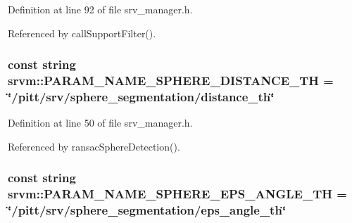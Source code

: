 Definition at line 92 of file srv\-\_\-manager.\-h.



Referenced by call\-Support\-Filter().

\hypertarget{namespacesrvm_aacb054d1f0139845cf32c294b210b96c}{
\subsubsection[{P\-A\-R\-A\-M\-\_\-\-N\-A\-M\-E\-\_\-\-S\-P\-H\-E\-R\-E\-\_\-\-D\-I\-S\-T\-A\-N\-C\-E\-\_\-\-T\-H}]{\setlength{\rightskip}{0pt plus 5cm}const string srvm\-::\-P\-A\-R\-A\-M\-\_\-\-N\-A\-M\-E\-\_\-\-S\-P\-H\-E\-R\-E\-\_\-\-D\-I\-S\-T\-A\-N\-C\-E\-\_\-\-T\-H = \char`\"{}/pitt/srv/sphere\-\_\-segmentation/distance\-\_\-th\char`\"{}}}\label{namespacesrvm_aacb054d1f0139845cf32c294b210b96c}


Definition at line 50 of file srv\-\_\-manager.\-h.



Referenced by ransac\-Sphere\-Detection().

\hypertarget{namespacesrvm_aac6381551a69b2d103ccdb9aeefcfa1d}{
\subsubsection[{P\-A\-R\-A\-M\-\_\-\-N\-A\-M\-E\-\_\-\-S\-P\-H\-E\-R\-E\-\_\-\-E\-P\-S\-\_\-\-A\-N\-G\-L\-E\-\_\-\-T\-H}]{\setlength{\rightskip}{0pt plus 5cm}const string srvm\-::\-P\-A\-R\-A\-M\-\_\-\-N\-A\-M\-E\-\_\-\-S\-P\-H\-E\-R\-E\-\_\-\-E\-P\-S\-\_\-\-A\-N\-G\-L\-E\-\_\-\-T\-H = \char`\"{}/pitt/srv/sphere\-\_\-segmentation/eps\-\_\-angle\-\_\-th\char`\"{}}}\label{namespacesrvm_aac6381551a69b2d103ccdb9aeefcfa1d}



